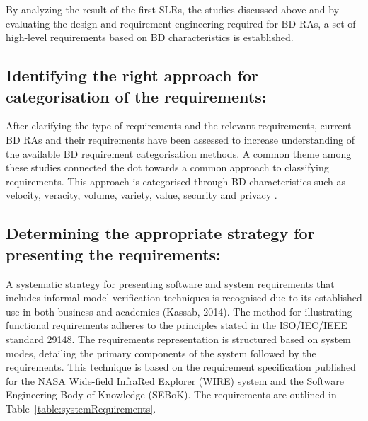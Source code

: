 \documentclass[preprint,12pt]{elsarticle}
\begin{document}
By analyzing the result of the first SLRs, the studies discussed above and by evaluating the design and requirement engineering required for BD RAs, a set of high-level requirements based on BD characteristics is established. 

\subsection{Identifying the right approach for categorisation of the requirements:}

After clarifying the type of requirements and the relevant requirements, current BD RAs and their requirements have been assessed to increase understanding of the available BD requirement categorisation methods. A common theme among these studies connected the dot towards a common approach to classifying requirements. This approach is categorised through BD characteristics such as velocity, veracity, volume, variety, value, security and privacy \cite{ataei2022state, Bahrami2015,rad2017big,Chen2016a}.

\subsection{Determining the appropriate strategy for presenting the requirements:} A systematic strategy for presenting software and system requirements that includes informal model verification techniques is recognised due to its established use in both business and academics (Kassab, 2014). The method for illustrating functional requirements adheres to the principles stated in the ISO/IEC/IEEE standard 29148. The requirements representation is structured based on system modes, detailing the primary components of the system followed by the requirements. This technique is based on the requirement specification published for the NASA Wide-field InfraRed Explorer (WIRE) system and the Software Engineering Body of Knowledge (SEBoK). The requirements are outlined in Table~\ref{table:systemRequirements}.
\end{document}
